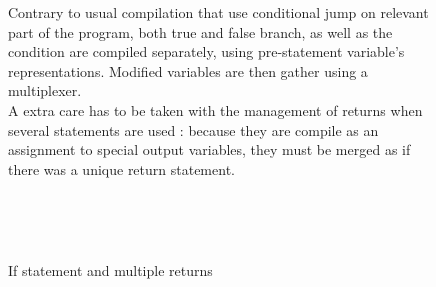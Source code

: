 \documentclass[10pt,a4paper]{article}
\begin{document}
\begin{figure}[h]
	\centering
	\begin{minipage}{.7\textwidth}
\quad Contrary to usual compilation that use conditional jump on relevant part of the program, both true and false branch, as well as the condition are compiled separately, using pre-statement variable's representations. Modified variables are then gather using a multiplexer. \\

\quad A extra care has to be taken with the management of returns when several statements are used : because they are compile as an assignment to special output variables, they must be merged as if there was a unique return statement.
	
	~	
	\qquad	{}
	\end{minipage}~~
	\begin{minipage}{.28\textwidth}
	\end{minipage}
	\caption{If statement and multiple returns}
\end{figure}
\end{document}
